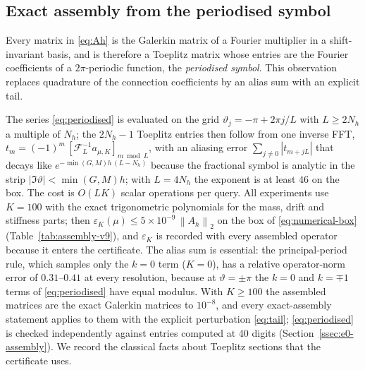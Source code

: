 \documentclass[hidelinks]{siamart251216}
\newcommand{\Ah}{A_h}
\newcommand{\norm}[1]{\left\lVert #1\right\rVert}
\newcommand{\sym}[1]{#1}                 %
\begin{document}
\subsection{Exact assembly from the periodised symbol}
\label{ssec:assembly}
Every matrix in \eqref{eq:Ah} is the Galerkin matrix of a Fourier multiplier in a shift-invariant
basis, and is therefore a Toeplitz matrix whose entries are the Fourier coefficients of a
$2\pi$-periodic function, the \emph{periodised symbol}.  This observation replaces quadrature of
the connection coefficients by an alias sum with an explicit tail.


The series \eqref{eq:periodised} is evaluated on the grid $\vartheta_j=-\pi+2\pi j/L$ with
$L\ge 2N_h$ a multiple of $N_h$; the $2N_h-1$ Toeplitz entries then follow from one inverse FFT,
$t_m=(-1)^m\,[\mathcal F_L^{-1}\sym{a}_{\mu,K}]_{m\bmod L}$, with an aliasing error
$\sum_{j\ne0}|t_{m+jL}|$ that decays like $e^{-\min(G,M)h\,(L-N_h)}$ because the fractional symbol is
analytic in the strip $|\Im\vartheta|<\min(G,M)h$; with $L=4N_h$ the exponent is at least $46$ on the
box.  The cost is $O(LK)$ scalar operations per query.
All experiments use $K=100$ with the exact trigonometric polynomials for the mass, drift and
stiffness parts; then $\varepsilon_K(\mu)\le5\times10^{-9}\,\norm{\Ah}_2$ on the box of
\eqref{eq:numerical-box} (Table~\ref{tab:assembly-v9}), and $\varepsilon_K$ is recorded with
every assembled operator because it enters the certificate.  The alias sum is essential: the
principal-period rule, which samples only the $k=0$ term ($K=0$), has a relative operator-norm
error of $0.31$--$0.41$ at every resolution, because at $\vartheta=\pm\pi$ the $k=0$ and $k=\mp1$
terms of \eqref{eq:periodised} have equal modulus.  With $K\ge100$ the assembled
matrices are the exact Galerkin matrices to $10^{-8}$, and every exact-assembly statement applies
to them with the explicit perturbation \eqref{eq:tail}; \eqref{eq:periodised} is checked
independently against entries computed at 40 digits (Section~\ref{ssec:e0-assembly}).
We record the classical facts about Toeplitz sections \cite{GrenanderSzego1958,BottcherSilbermann1999}
that the certificate uses.

\end{document}
